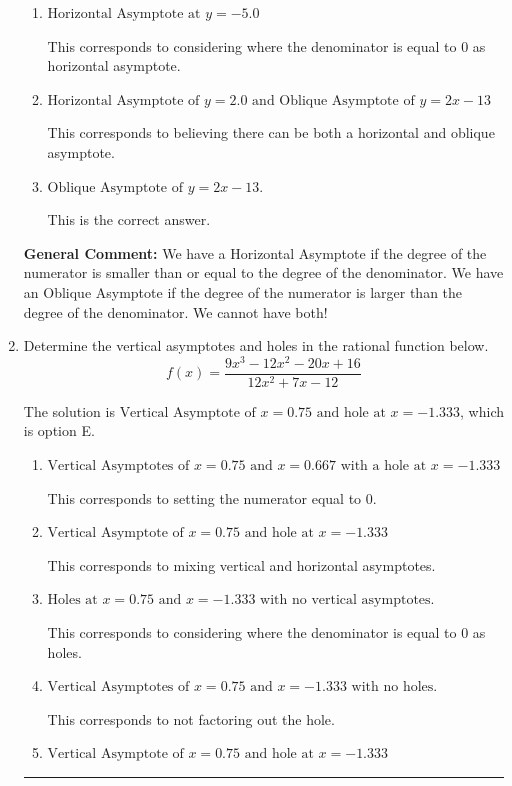 \documentclass{extbook}[14pt]
\newcommand{\litem}[1]{\item #1

\rule{\textwidth}{0.4pt}}
\begin{document}
\begin{enumerate}
{\begin{enumerate}[label=\Alph*.]
This corresponds to believing there can be both a horizontal and oblique asymptote AND mixing up horizontal/vertical asymoptote.
\item \( \text{Horizontal Asymptote at } y = -5.0 \)

This corresponds to considering where the denominator is equal to 0 as horizontal asymptote.
\item \( \text{Horizontal Asymptote of } y = 2.0 \text{ and Oblique Asymptote of } y = 2x -13 \)

This corresponds to believing there can be both a horizontal and oblique asymptote.
\item \( \text{Oblique Asymptote of } y = 2x -13. \)

This is the correct answer.
\end{enumerate}

\textbf{General Comment:} We have a Horizontal Asymptote if the degree of the numerator is smaller than or equal to the degree of the denominator. We have an Oblique Asymptote if the degree of the numerator is larger than the degree of the denominator. We cannot have both!
}
\litem{
Determine the vertical asymptotes and holes in the rational function below.
\[ f(x) = \frac{9x^{3} -12 x^{2} -20 x + 16}{12x^{2} +7 x -12} \]

The solution is \( \text{Vertical Asymptote of } x = 0.75 \text{ and hole at } x = -1.333 \), which is option E.\begin{enumerate}[label=\Alph*.]
\item \( \text{Vertical Asymptotes of } x = 0.75 \text{ and } x = 0.667 \text{ with a hole at } x = -1.333 \)

This corresponds to setting the numerator equal to 0.
\item \( \text{Vertical Asymptote of } x = 0.75 \text{ and hole at } x = -1.333 \)

This corresponds to mixing vertical and horizontal asymptotes.
\item \( \text{Holes at } x = 0.75 \text{ and } x = -1.333 \text{ with no vertical asymptotes.} \)

This corresponds to considering where the denominator is equal to 0 as holes.
\item \( \text{Vertical Asymptotes of } x = 0.75 \text{ and } x = -1.333 \text{ with no holes.} \)

This corresponds to not factoring out the hole.
\item \( \text{Vertical Asymptote of } x = 0.75 \text{ and hole at } x = -1.333 \)


\end{enumerate}}
\end{enumerate}
\end{document}
